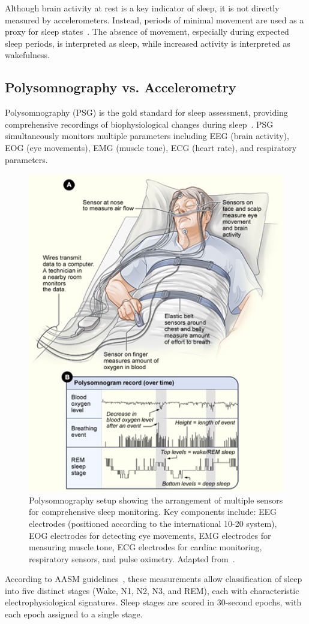 \documentclass[conference]{IEEEtran}
\begin{document}
Although brain activity at rest is a key indicator of sleep, it is not directly measured by accelerometers. Instead, periods of minimal movement are used as a proxy for sleep states~\cite{pmc5781106}. The absence of movement, especially during expected sleep periods, is interpreted as sleep, while increased activity is interpreted as wakefulness.

\subsection{Polysomnography vs. Accelerometry}

Polysomnography (PSG) is the gold standard for sleep assessment, providing comprehensive recordings of biophysiological changes during sleep~\cite{rechtschaffen1968, aasm2007}. PSG simultaneously monitors multiple parameters including EEG (brain activity), EOG (eye movements), EMG (muscle tone), ECG (heart rate), and respiratory parameters.

\begin{figure}[h]
	\centering
	\includegraphics[width=0.5\linewidth]{figures/psg_setup_diagram.png}
	\caption{Polysomnography setup showing the arrangement of multiple sensors for comprehensive sleep monitoring. Key components include: EEG electrodes (positioned according to the international 10-20 system), EOG electrodes for detecting eye movements, EMG electrodes for measuring muscle tone, ECG electrodes for cardiac monitoring, respiratory sensors, and pulse oximetry. Adapted from~\cite{psychdb2023}.}
	\label{fig:psg_setup}
\end{figure}

According to AASM guidelines~\cite{aasm2007}, these measurements allow classification of sleep into five distinct stages (Wake, N1, N2, N3, and REM), each with characteristic electrophysiological signatures. Sleep stages are scored in 30-second epochs, with each epoch assigned to a single stage.
\end{document}
